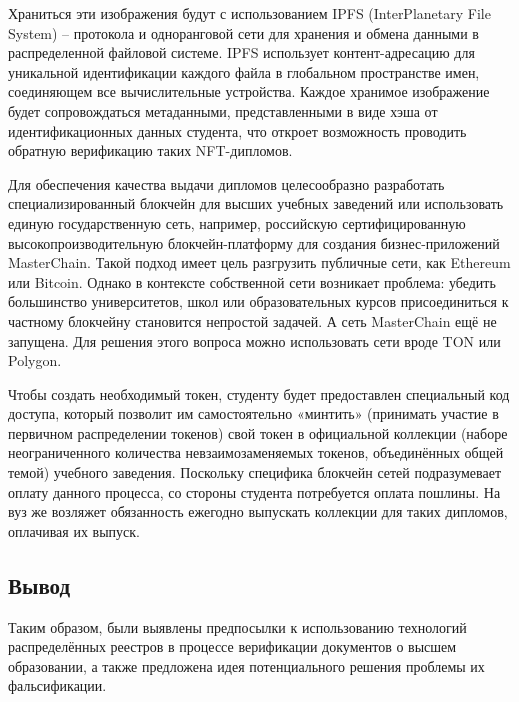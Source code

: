 \documentclass{mirea-article}
\begin{document}
Храниться эти изображения будут с использованием IPFS (InterPlanetary File System) – протокола и одноранговой сети для хранения и обмена данными в распределенной файловой системе. IPFS использует контент-адресацию для уникальной идентификации каждого файла в глобальном пространстве имен, соединяющем все вычислительные устройства. Каждое хранимое изображение будет сопровождаться метаданными, представленными в виде хэша от идентификационных данных студента, что откроет возможность проводить обратную верификацию таких NFT-дипломов.

Для обеспечения качества выдачи дипломов целесообразно разработать специализированный блокчейн для высших учебных заведений или использовать единую государственную сеть, например, российскую сертифицированную высокопроизводительную блокчейн-платформу для создания бизнес-приложений MasterChain. Такой подход имеет цель разгрузить публичные сети, как Ethereum или Bitcoin. Однако в контексте собственной сети возникает проблема: убедить большинство университетов, школ или образовательных курсов присоединиться к частному блокчейну становится непростой задачей. А сеть MasterChain ещё не запущена. Для решения этого вопроса можно использовать сети вроде TON или Polygon.

Чтобы создать необходимый токен, студенту будет предоставлен специальный код доступа, который позволит им самостоятельно «минтить» (принимать участие в первичном распределении токенов) свой токен в официальной коллекции (наборе неограниченного количества невзаимозаменяемых токенов, объединённых общей темой) учебного заведения. Поскольку специфика блокчейн сетей подразумевает оплату данного процесса, со стороны студента потребуется оплата пошлины. На вуз же возляжет обязанность ежегодно выпускать коллекции для таких дипломов, оплачивая их выпуск.

\subsection*{Вывод}

Таким образом, были выявлены предпосылки к использованию технологий распределённых реестров в процессе верификации документов о высшем образовании, а также предложена идея потенциального решения проблемы их фальсификации.
\end{document}
